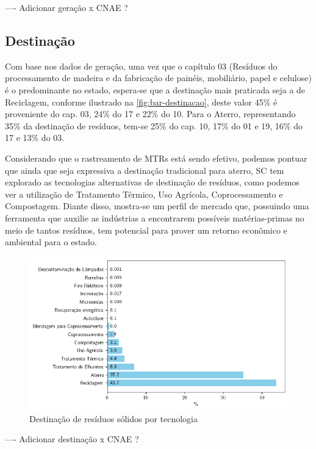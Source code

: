 ---- Adicionar geração x CNAE ?

\pagebreak
\subsection{Destinação}

Com base nos dados de geração, uma vez que o capítulo 03 (Resíduos do processamento de madeira e da fabricação de painéis, mobiliário, papel e celulose) é o predominante no estado, espera-se que a destinação mais praticada seja a de Reciclagem, conforme ilustrado na \autoref{fig:bar-destinacao}, deste valor 45\% é proveniente do cap. 03, 24\% do 17 e 22\% do 10. Para o Aterro, representando 35\% da destinação de resíduos, tem-se 25\% do cap. 10, 17\% do 01 e 19, 16\% do 17 e 13\% do 03.

Considerando que o rastreamento de \gls{MTR}s está sendo efetivo, podemos pontuar que ainda que seja expressiva a destinação tradicional para aterro, \gls{SC} tem explorado as tecnologias alternativas de destinação de resíduos, como podemos ver a utilização de Tratamento Térmico, Uso Agrícola, Coprocessamento e Compostagem. Diante disso, mostra-se um perfil de mercado que, possuindo uma ferramenta que auxilie as indústrias a encontrarem possíveis matérias-primas no meio de tantos resíduos, tem potencial para prover um retorno econômico e ambiental para o estado.

\begin{figure}[htb]
	\caption{\label{fig:bar-destinacao} Destinação de resíduos sólidos por tecnologia}
	\begin{center}
		\includegraphics[scale=0.8]{images/bar-destinacao.png}
	\end{center}
\end{figure}

---- Adicionar destinação x CNAE ?